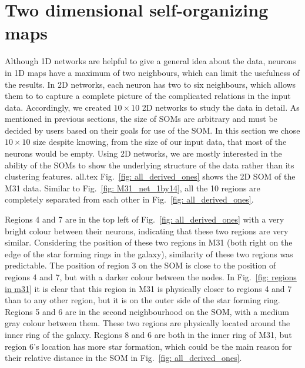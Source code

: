  \section{Two dimensional self-organizing maps}
 \label{sec: 2d_cluster}
    Although 1D networks are helpful to give a general idea about the data, neurons in 1D maps have a maximum of two neighbours, which can limit the usefulness of the results.
    In 2D networks, each neuron has two to six neighbours, which allows them to to capture a complete picture of the complicated relations in the input data.
    Accordingly, we created $10\times10$ 2D networks to study the data in detail.
    As mentioned in previous sections, the size of SOMs are arbitrary and must be decided by users based on their goals for use of the SOM.
    In this section we chose $10\times10$ size despite knowing, from the size of our input data, that most of the neurons would be empty.
    Using 2D networks, we are mostly interested in the ability of the SOMs to show the underlying structure of the data rather than its clustering features.
    {all.tex}
    Fig.~\ref{fig: all_derived_ones} shows the 2D SOM of the M31 data.
    Similar to Fig.~\ref{fig: M31_net_1by14}, all the 10 regions are completely separated from each other in Fig.~\ref{fig: all_derived_ones}.
    
    Regions 4 and 7 are in the top left of Fig.~\ref{fig: all_derived_ones} with a very bright colour between their neurons, indicating that these two regions are very similar.
    Considering the position of these two regions in M31 (both right on the edge of the star forming rings in the galaxy), similarity of these two regions was predictable.
    The position of region 3 on the SOM is close to the position of regions 4 and 7, but with a darker colour between the nodes. 
    In Fig.~\ref{fig: regions in m31} it is clear that this region in M31 is physically closer to regions 4 and 7 than to any other region, but it is on the outer side of the star forming ring.
    Regions 5 and 6 are in the second neighbourhood on the SOM, with a medium gray colour between them.
    These two regions are physically located around the inner ring of the galaxy.
    Regions 8 and 6 are both in the inner ring of M31, but region 6's location has more star formation, which could be the main reason for their relative distance in the SOM in Fig.~\ref{fig: all_derived_ones}. 
    
